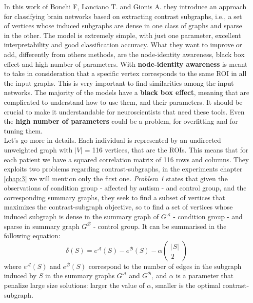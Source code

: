 In this work of Bonchi F, Lanciano T. and Gionis A. \cite{lanciano2020cs} they introduce an approach for classifying brain networks based on extracting contrast subgraphs, i.e., a set of vertices whose induced subgraphs are dense in one class of graphs and sparse in the other. The model is extremely simple, with just one parameter, excellent interpretability and good classification accuracy. What they want to improve or add, differently from others methods, are the node-identity awareness, black box effect and high number of parameters. With \textbf{node-identity awareness} is meant to take in consideration that a specific vertex corresponds to the same ROI in all the input graphs. This is very important to find similarities among the input networks. The majority of the models have a \textbf{black box effect}, meaning that are complicated to understand how to use them, and their parameters. It should be crucial to make it understandable for neuroscientists that need these tools. Even the \textbf{high number of parameters} could be a problem, for overfitting and for tuning them. 
\\

Let's go more in details. Each individual is represented by an undirected unweighted graph with $|V|$ = 116 vertices, that are the ROIs. This means that for each patient we have a squared correlation matrix of 116 rows and columns. They exploits two problems regarding contrast-subgraphs, in the experiments chapter \ref{chap:3} we will mention only the first one. \textit{Problem 1} states that given the observations of condition group - affected by autism - and control group, and the corresponding summary graphs, they seek to find a subset of vertices that maximizes the contrast-subgraph objective, so to find a set of vertices whose induced subgraph is dense in the summary graph of $G^{\mathcal{A}}$ - condition group - and sparse in summary graph $G^{\mathcal{B}}$ - control group. It can be summarised in the following equation:
\begin{equation}
	\delta(S)=e^{\mathcal{A}}(S)-e^{\mathcal{B}}(S)-\alpha\left(\begin{array}{c}
		|S| \\
		2
	\end{array}\right)
\end{equation}
where $ e^{\mathcal{A}}(S) $ and $ e^{\mathcal{B}}(S) $ correspond to the number of edges in the subgraph induced by $ S $ in the summary graphs $G^{\mathcal{A}}$ and $G^{\mathcal{B}}$, and $ \alpha $ is a parameter that penalize large size solutions: larger the value of $\alpha$, smaller is the optimal contrast-subgraph. 
\\

